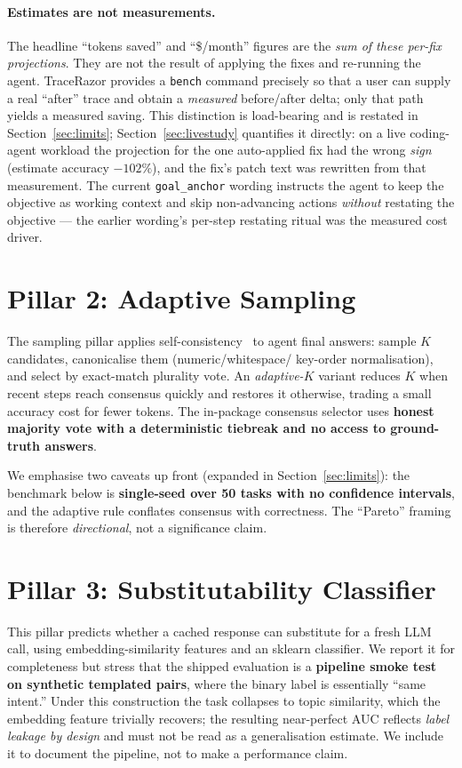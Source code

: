 \documentclass[11pt]{article}
\newcommand{\code}[1]{\texttt{#1}}
\begin{document}
\paragraph{Estimates are not measurements.} The headline ``tokens saved'' and
``\$/month'' figures are the \emph{sum of these per-fix projections}. They are
not the result of applying the fixes and re-running the agent. TraceRazor
provides a \code{bench} command precisely so that a user can supply a real
``after'' trace and obtain a \emph{measured} before/after delta; only that path
yields a measured saving. This distinction is load-bearing and is restated in
Section~\ref{sec:limits}; Section~\ref{sec:livestudy} quantifies it directly:
on a live coding-agent workload the projection for the one auto-applied fix had
the wrong \emph{sign} (estimate accuracy $-102\%$), and the fix's patch text
was rewritten from that measurement. The current \code{goal\_anchor} wording
instructs the agent to keep the objective as working context and skip
non-advancing actions \emph{without} restating the objective --- the earlier
wording's per-step restating ritual was the measured cost driver.

\section{Pillar 2: Adaptive Sampling}
\label{sec:sampling}
The sampling pillar applies self-consistency~\cite{selfconsistency} to agent
final answers: sample $K$ candidates, canonicalise them (numeric/whitespace/
key-order normalisation), and select by exact-match plurality vote. An
\emph{adaptive-$K$} variant reduces $K$ when recent steps reach consensus quickly
and restores it otherwise, trading a small accuracy cost for fewer tokens. The
in-package consensus selector uses \textbf{honest majority vote with a
deterministic tiebreak and no access to ground-truth answers}.

We emphasise two caveats up front (expanded in Section~\ref{sec:limits}): the
benchmark below is \textbf{single-seed over 50 tasks with no confidence
intervals}, and the adaptive rule conflates consensus with correctness. The
``Pareto'' framing is therefore \emph{directional}, not a significance claim.

\section{Pillar 3: Substitutability Classifier}
\label{sec:subst}
This pillar predicts whether a cached response can substitute for a fresh LLM
call, using embedding-similarity features and an sklearn classifier. We report it
for completeness but stress that the shipped evaluation is a \textbf{pipeline
smoke test on synthetic templated pairs}, where the binary label is essentially
``same intent.'' Under this construction the task collapses to topic similarity,
which the embedding feature trivially recovers; the resulting near-perfect AUC
reflects \emph{label leakage by design} and must not be read as a generalisation
estimate. We include it to document the pipeline, not to make a performance
claim.
\end{document}

